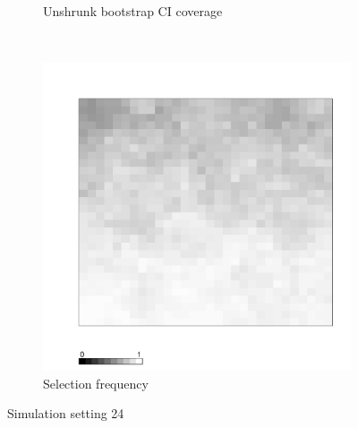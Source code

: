 \documentclass[authoryear, review, 11pt]{elsarticle}
\begin{document}
\begin{figure}
\begin{subfigure}[b]{0.45\textwidth}
		\caption{Unshrunk bootstrap CI coverage}
	\end{subfigure}%
	~ %
	\begin{subfigure}[b]{0.45\textwidth}
	\centering
		\includegraphics[width=\textwidth]{../../figures/simulation/X1.15.24.selection.pdf}
		\caption{Selection frequency}
	\end{subfigure}
	\caption{Simulation setting 24}
\end{figure}
\end{document}
